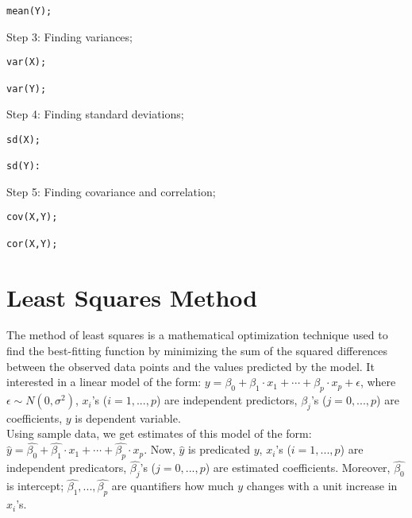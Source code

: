 \begin{example}
\begin{tcolorbox}[colback=gray!10, colframe=gray!50, arc=2mm]
\begin{verbatim}
mean(Y);
\end{verbatim}
\end{tcolorbox}

Step 3: Finding variances;

\begin{tcolorbox}[colback=gray!10, colframe=gray!50, arc=2mm]
\begin{verbatim}
var(X);

var(Y);
\end{verbatim}
\end{tcolorbox}

Step 4: Finding standard deviations;

\begin{tcolorbox}[colback=gray!10, colframe=gray!50, arc=2mm]
\begin{verbatim}
sd(X);

sd(Y):
\end{verbatim}
\end{tcolorbox}

Step 5: Finding covariance and correlation;

\begin{tcolorbox}[colback=gray!10, colframe=gray!50, arc=2mm]
\begin{verbatim}
cov(X,Y);

cor(X,Y);
\end{verbatim}
\end{tcolorbox}
\end{example}

\section{Least Squares Method}

The method of least squares is a mathematical optimization technique used to find the best-fitting function by minimizing the sum of the squared differences between the observed data points and the values predicted by the model. It interested in a linear model of the form: $y  = \beta_0 + \beta_1 \cdot x_1 + \cdots + \beta_p \cdot x_p + \epsilon$, where $\epsilon \sim N(0, \sigma^2)$, $x_i$'s ($i = 1,..., p$) are independent predictors, $\beta_j$'s ($j = 0,..., p$) are coefficients, $y$ is dependent variable.\\

Using sample data, we get estimates of this model of the form: $\hat{y} = \hat{\beta_0} + \hat{\beta_1} \cdot x_1 + \cdots + \hat{\beta_p} \cdot x_p$. Now, $\hat{y}$ is predicated $y$, $x_i$'s ($i = 1,...,p$) are independent predicators, $\hat{\beta_j}$'s ($j = 0,...,p$) are estimated coefficients. Moreover, $\hat{\beta_0}$ is intercept; $\hat{\beta_1},...,\hat{\beta_p}$ are quantifiers how much $y$ changes with a unit increase in $x_i$'s.\\

